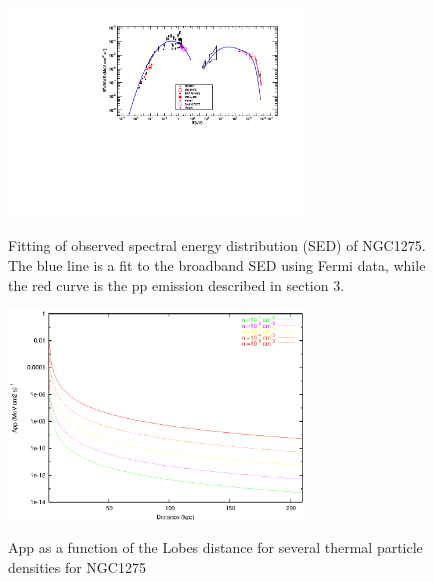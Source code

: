 \documentclass[useAMS,usenatbib,a4]{mn2e}
\begin{document}
\begin{figure}[h!]
 \centering
  \includegraphics[width=0.7\textwidth]{NGC1275pp.pdf}\\
  \caption{Fitting of observed spectral energy distribution (SED) of NGC1275.  The blue line is a fit to the broadband SED using Fermi data, while the red curve is the pp emission described in section 3.}\label{SEDpp}
\end{figure} 








\begin{figure}[h!]
 \centering
  \includegraphics[width=0.7\textwidth]{NGC1275.eps}\\
  \caption{ App as a function of the Lobes distance for several thermal particle densities for  NGC1275 }\label{densNGC1275}
\end{figure}
\end{document}
